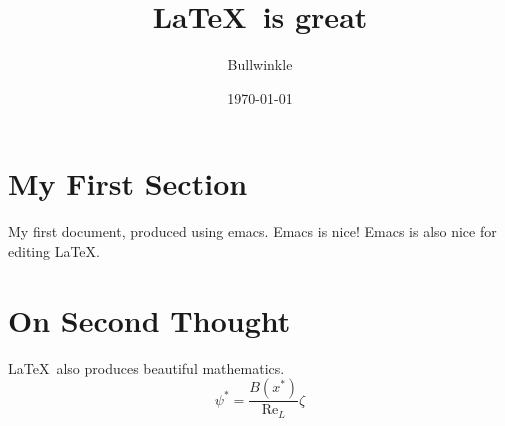 \documentclass{article}
\begin{document}
\title{\LaTeX\ is great}
\author{Bullwinkle}
\date{\today}
\maketitle

\tableofcontents

\printnomenclature

\section{My First Section}

My first document, produced using emacs.  Emacs is nice!
Emacs is also nice for editing \LaTeX.

\section{On Second Thought}

\LaTeX\ also  produces beautiful mathematics.
\begin{equation}
\psi^\ast = \frac{B(x^\ast)}{\mathrm{Re}_L}\zeta
\end{equation}
%
%
%
\end{document}
